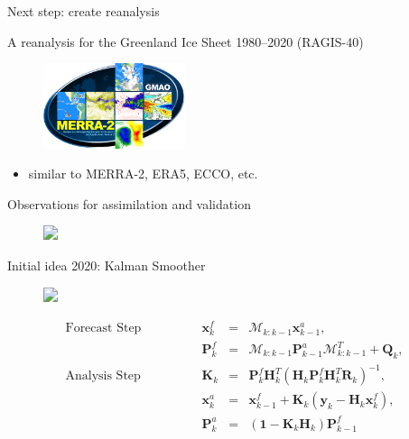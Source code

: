 \documentclass[hide notes,intlimits]{beamer}
\begin{document}
\begin{frame}{Next step: create reanalysis}
  \begin{block}{A reanalysis for the Greenland Ice Sheet 1980--2020 (RAGIS-40)}
    \begin{figure}
      \includegraphics[height=2.5cm]{merra2-logo}
    \end{figure}
    \begin{itemize}
      \item similar to MERRA-2, ERA5, ECCO, etc.
    \end{itemize}
  \end{block}
\end{frame}


\begin{frame}{Observations for assimilation and validation}
  \begin{figure}
    \includegraphics<1->[width=\textwidth]{observation-timeline}
  \end{figure}
\end{frame}

\begin{frame}{Initial idea 2020: Kalman Smoother}
  \begin{figure}
    \includegraphics<1->[width=\textwidth]{flowchart-kalman-smoother}
  \end{figure}
  \tiny
  \begin{equation}
    \begin{array}{lccc}
     \textrm{Forecast Step} \qquad \qquad & \mathbf{x}_{k}^{f} &=&  \mathcal{M}_{k:k-1} \mathbf{x}_{k-1}^a, \\[.5em]
     &  \mathbf{P}_{k}^{f} &=&  \mathcal{M}_{k:k-1} \mathbf{P}_{k-1}^a \mathcal{M}_{k:k-1}^{T} + \mathbf{Q}_{k}, \\[1.em]
     \textrm{Analysis Step} \qquad \qquad & \mathbf{K}_{k} & = & \mathbf{P}_{k}^{f} \mathbf{H}_{k}^{T}\left(\mathbf{H}_{k} \mathbf{P}_{k}^{f} \mathbf{H}_{k}^{T} \mathbf{R}_{k} \right)^{-1}, \\[0.5em]
     & \mathbf{x}_{k}^{a} &=&  \mathbf{x}_{k-1}^f + \mathbf{K}_{k} \left(\mathbf{y}_{k} - \mathbf{H}_{k} \mathbf{x}_{k}^{f} \right), \\[.5em]
     &  \mathbf{P}_{k}^{a} &=&  \left( \mathbf{1} - \mathbf{K}_{k} \mathbf{H}_{k} \right)\mathbf{P}_{k-1}^f
     \\\end{array}
  \end{equation}
  \normalsize
\end{frame}
\end{document}

